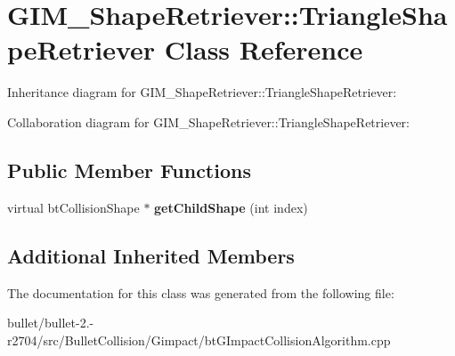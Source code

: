 \hypertarget{class_g_i_m___shape_retriever_1_1_triangle_shape_retriever}{\section{G\+I\+M\+\_\+\+Shape\+Retriever\+:\+:Triangle\+Shape\+Retriever Class Reference}
\label{class_g_i_m___shape_retriever_1_1_triangle_shape_retriever}
}


Inheritance diagram for G\+I\+M\+\_\+\+Shape\+Retriever\+:\+:Triangle\+Shape\+Retriever\+:


Collaboration diagram for G\+I\+M\+\_\+\+Shape\+Retriever\+:\+:Triangle\+Shape\+Retriever\+:
\subsection*{Public Member Functions}
\begin{DoxyCompactItemize}
\item 
\hypertarget{class_g_i_m___shape_retriever_1_1_triangle_shape_retriever_a98f27b2f6747fec538220ae796625d30}{virtual bt\+Collision\+Shape $\ast$ {\bfseries get\+Child\+Shape} (int index)}\label{class_g_i_m___shape_retriever_1_1_triangle_shape_retriever_a98f27b2f6747fec538220ae796625d30}

\end{DoxyCompactItemize}
\subsection*{Additional Inherited Members}


The documentation for this class was generated from the following file\+:\begin{DoxyCompactItemize}
\item 
bullet/bullet-\/2.-\/r2704/src/\+Bullet\+Collision/\+Gimpact/bt\+G\+Impact\+Collision\+Algorithm.\+cpp\end{DoxyCompactItemize}
